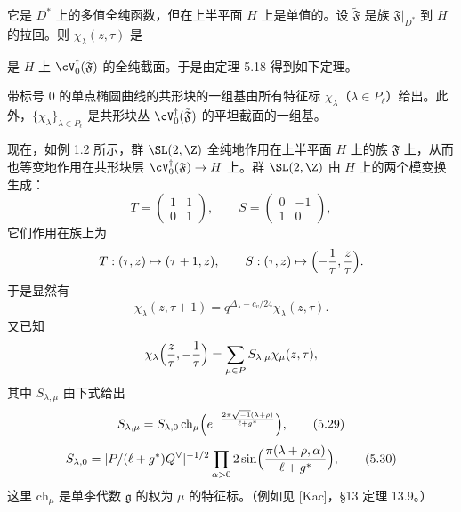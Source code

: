 它是 $D^*$ 上的多值全纯函数，但在上半平面 $H$ 上是单值的。设 $\tilde{\mathfrak F}$ 是族 $\mathfrak{F}|_{D^*}$ 到 $H$ 的拉回。则 $\chi_\lambda(z,\tau)$ 是



是 $H$ 上 $\cV_0^\dagger(\tilde{\mathfrak F})$ 的全纯截面。于是由定理 5.18 得到如下定理。

\begin{theorem}[5.19]
带标号 $0$ 的单点椭圆曲线的共形块的一组基由所有特征标 $\chi_\lambda$（$\lambda\in P_\ell$）给出。此外，$\{\chi_\lambda\}_{\lambda\in P_\ell}$ 是共形块丛 $\cV_0^\dagger(\tilde{\mathfrak F})$ 的平坦截面的一组基。
\end{theorem}

现在，如例 1.2 所示，群 $\SL(2,\Z)$ 全纯地作用在上半平面 $H$ 上的族 $\mathfrak{F}$ 上，从而也等变地作用在共形块层 $\cV_0^\dagger(\mathfrak{F})\to H$ 上。群 $\SL(2,\Z)$ 由 $H$ 上的两个模变换生成：
\[
T=\begin{pmatrix}1&1\\0&1\end{pmatrix},\qquad
S=\begin{pmatrix}0&-1\\1&0\end{pmatrix},
\]
它们作用在族上为
\[
T:(\tau,z)\mapsto(\tau+1,z),\qquad
S:(\tau,z)\mapsto\Bigl(-\frac{1}{\tau},\frac{z}{\tau}\Bigr).
\]
于是显然有
\[
\chi_\lambda(z,\tau+1)=q^{\Delta_\lambda-c_v/24}\chi_\lambda(z,\tau).
\]
又已知
\[
\chi_\lambda\Bigl(\frac{z}{\tau},-\frac{1}{\tau}\Bigr)
=\sum_{\mu\in P}S_{\lambda,\mu}\chi_\mu(z,\tau),
\]
其中 $S_{\lambda,\mu}$ 由下式给出
\begin{equation}
S_{\lambda,\mu}=S_{\lambda,0}\,\mathrm{ch}_\mu
\Bigl(e^{-\frac{2\pi\sqrt{-1}(\lambda+\rho)}{\ell+g^*}}\Bigr), \tag{5.29}
\end{equation}
\begin{equation}
S_{\lambda,0}=|P/(\ell+g^*)Q^\vee|^{-1/2}
\prod_{\alpha>0}2\sin\Bigl(\frac{\pi(\lambda+\rho,\alpha)}{\ell+g^*}\Bigr), \tag{5.30}
\end{equation}
这里 $\mathrm{ch}_\mu$ 是单李代数 $\mathfrak g$ 的权为 $\mu$ 的特征标。（例如见 [Kac]，§13 定理 13.9。）

